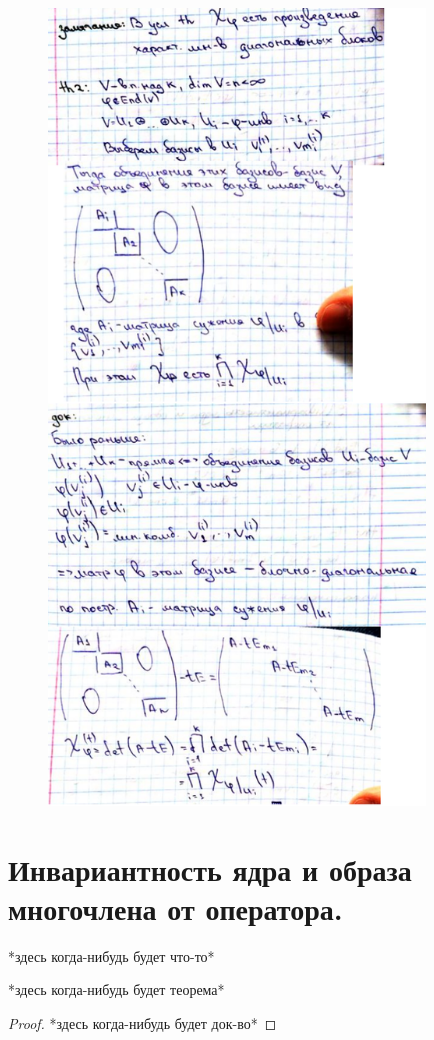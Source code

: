 \documentclass[algebra]{subfiles}
\begin{document}
    \begin{figure}[H]
            \includegraphics[width=10cm]{pics/55_3}
            \centering
    \end{figure}

    \section{Инвариантность ядра и образа многочлена от оператора.}
    *здесь когда-нибудь будет что-то*
    \begin{theorem}
      *здесь когда-нибудь будет теорема*
    \end{theorem}

    \begin{proof}
      *здесь когда-нибудь будет док-во*
    \end{proof}
\end{document}
